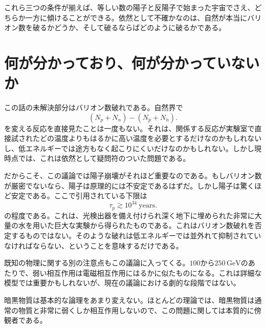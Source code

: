 \begin{classroomqa}
\end{classroomqa}

これら三つの条件が揃えば、等しい数の陽子と反陽子で始まった宇宙でさえ、どちらか一方に傾けることができる。依然として不確かなのは、自然が本当にバリオン数を破るかどうか、そして破るならばどのように破るかである。

\section{何が分かっており、何が分かっていないか}

この話の未解決部分はバリオン数破れである。自然界で
\[
(N_p+N_n)-(N_{\bar p}+N_{\bar n}).
\]
を変える反応を直接見たことは一度もない。それは、関係する反応が実験室で直接試されたどの温度よりもはるかに高い温度を必要とするだけなのかもしれないし、低エネルギーでは途方もなく起こりにくいだけなのかもしれない。しかし現時点では、これは依然として疑問符のついた問題である。

だからこそ、この議論では陽子崩壊がそれほど重要なのである。もしバリオン数が厳密でないなら、陽子は原理的には不安定であるはずだ。しかし陽子は驚くほど安定である。ここで引用されている下限は
\[
\tau_p \gtrsim 10^{34}\ \text{years}.
\]
の程度である。これは、光検出器を備え付けられ深く地下に埋められた非常に大量の水を用いた巨大な実験から得られたものである。これはバリオン数破れを否定するものではない。そのような破れは低エネルギーでは並外れて抑制されていなければならない、ということを意味するだけである。

既知の物理に関する別の注意点もこの議論に入ってくる。\(100\)から\(250\,\mathrm{GeV}\)のあたりで、弱い相互作用は電磁相互作用にはるかに似たものになる。これは詳細な模型では重要かもしれないが、現在の議論における劇的な段階ではない。

暗黒物質は基本的な論理をあまり変えない。ほとんどの理論では、暗黒物質は通常の物質と非常に弱くしか相互作用しないので、この問題に関しては本質的に傍観者である。

\begin{classroomqa}
\end{classroomqa}

